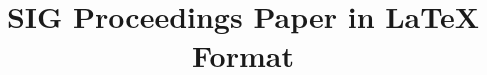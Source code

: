 \documentclass{report}%
\begin{document}
\title{SIG Proceedings Paper in LaTeX Format}





%
%



\maketitle





%

\end{document}
